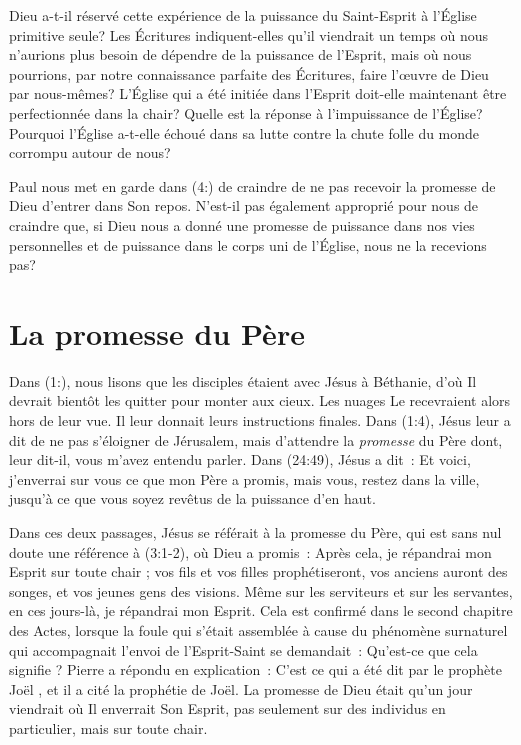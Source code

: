 Dieu a-t-il réservé cette expérience de la puissance du Saint-Esprit à
 l'Église primitive seule? Les Écritures indiquent-elles qu'il viendrait
 un temps où nous n'aurions plus besoin de dépendre de la puissance
 de l'Esprit, mais où nous pourrions, par notre connaissance parfaite
 des Écritures, faire l'œuvre de Dieu par nous-mêmes? L'Église qui a été
 initiée dans l'Esprit doit-elle maintenant être perfectionnée dans
 la chair?
 Quelle est la réponse à l'impuissance de l'Église?
 Pourquoi l'Église a-t-elle échoué dans sa lutte contre la chute folle
 du monde corrompu autour de nous?

Paul nous met en garde dans (4:) de craindre de ne pas
 recevoir la promesse de Dieu d'entrer dans Son repos.
 N'est-il pas également approprié pour nous de craindre que, si Dieu
 nous a donné une promesse de puissance dans nos vies personnelles et de
 puissance dans le corps uni de l'Église, nous ne la recevions pas?


\section*{La promesse du Père}

Dans (1:), nous lisons que les disciples étaient avec
 Jésus à Béthanie, d'où Il devrait bientôt les quitter pour monter
 aux cieux.
 Les nuages Le recevraient alors hors de leur vue.
 Il leur donnait leurs instructions finales.
 Dans (1:4), Jésus leur a dit de \og ne pas s'éloigner
 de Jérusalem, mais d'attendre la \emph{promesse} du Père dont, leur dit-il,
 vous m'avez entendu parler. \fg{}
 Dans (24:49), Jésus a dit~:
 \og Et voici, j'enverrai sur vous ce que mon Père a promis, mais vous,
 restez dans la ville, jusqu'à ce que vous soyez revêtus de la puissance
 d'en haut.\fg{}

Dans ces deux passages, Jésus se référait à la promesse du Père, qui est
 sans nul doute une référence à (3:1-2), où Dieu a promis~:
 \og Après cela, je répandrai mon Esprit sur toute chair ;
 vos fils et vos filles prophétiseront, vos anciens auront des songes,
 et vos jeunes gens des visions.
 Même sur les serviteurs et sur les servantes,
 en ces jours-là, je répandrai mon Esprit. \fg{}
 Cela est confirmé dans le second chapitre des Actes, lorsque la foule qui
 s'était assemblée à cause du phénomène surnaturel qui accompagnait l'envoi
 de l'Esprit-Saint se demandait~:
 \og Qu'est-ce que cela signifie ? \fg{}
 Pierre a répondu en explication~:
 \og C'est ce qui a été dit par le prophète Joël \fg{},
 et il a cité la prophétie de Joël.
 La promesse de Dieu était qu'un jour viendrait où Il enverrait Son Esprit,
 pas seulement sur des individus en particulier, mais sur toute chair.

